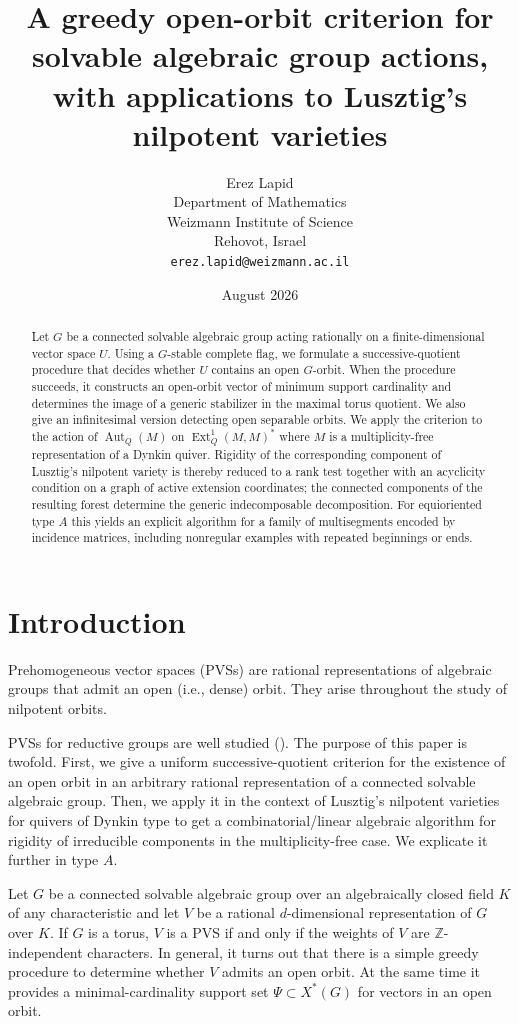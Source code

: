 \documentclass[12pt]{article}
\title{A greedy open-orbit criterion for solvable algebraic group actions, with applications to Lusztig's nilpotent varieties}
\author{Erez Lapid\\
Department of Mathematics\\
Weizmann Institute of Science\\
Rehovot, Israel\\
\texttt{erez.lapid@weizmann.ac.il}}
\date{August 2026}
\newcommand{\Z}{\mathbb{Z}}
\newcommand{\Ext}{\operatorname{Ext}}
\newcommand{\Aut}{\operatorname{Aut}}
\newcommand{\PVS}{PVS}
\begin{document}
\maketitle

\begin{abstract}
Let $G$ be a connected solvable algebraic group acting rationally on a finite-dimensional vector space $U$.
Using a $G$-stable complete flag, we formulate a successive-quotient procedure that decides whether
$U$ contains an open $G$-orbit. When the procedure succeeds, it constructs an open-orbit vector of minimum
support cardinality and determines the image of a generic stabilizer in the maximal torus quotient.
We also give an infinitesimal version detecting open separable orbits. We apply the criterion to the action of $\Aut_Q(M)$
on $\Ext^1_Q(M,M)^*$ where $M$ is a multiplicity-free representation of a Dynkin quiver.
Rigidity of the corresponding component of Lusztig's nilpotent variety is thereby reduced to a rank test together with an acyclicity condition on a graph of active extension coordinates;
the connected components of the resulting forest determine the generic indecomposable decomposition.
For equioriented type $A$ this yields an explicit algorithm for a family of multisegments encoded by incidence matrices, including nonregular examples with repeated beginnings or ends.
\end{abstract}

\setcounter{tocdepth}{1}
\tableofcontents

\section{Introduction}\label{sec:intro}
Prehomogeneous vector spaces (\PVS s) are rational representations of algebraic groups that admit an open (i.e., dense) orbit.
They arise throughout the study of nilpotent orbits.

\PVS s for reductive groups are well studied (\cites{MR430336, MR1944442}).
The purpose of this paper is twofold. First, we give a uniform successive-quotient criterion for the existence of an open orbit
in an arbitrary rational representation of a connected solvable algebraic group.
Then, we apply it in the context of Lusztig's nilpotent varieties for quivers of Dynkin type to get a combinatorial/linear algebraic algorithm
for rigidity of irreducible components in the multiplicity-free case. We explicate it further in type $A$.

Let $G$ be a connected solvable algebraic group over an algebraically closed field $K$ of any characteristic and
let $V$ be a rational $d$-dimensional representation of $G$ over $K$.
If $G$ is a torus, $V$ is a {\PVS} if and only if the weights of $V$ are $\Z$-independent characters.
In general, it turns out that there is a simple greedy procedure to determine whether $V$ admits an open orbit.
At the same time it provides a minimal-cardinality support set $\Psi\subset X^*(G)$ for vectors in an open orbit.
\end{document}
